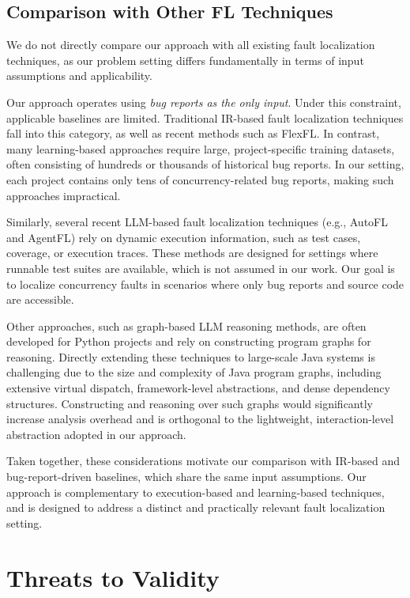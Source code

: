 \subsection{Comparison with Other FL Techniques}
\label{sec:discussion-comparison}

We do not directly compare our approach with all existing fault localization techniques, as our problem setting differs fundamentally in terms of input assumptions and applicability.

Our approach operates using \emph{bug reports as the only input}. Under this constraint, applicable baselines are limited.  Traditional IR-based fault localization techniques fall into this category, as well as recent methods such as FlexFL. In contrast, many learning-based approaches require large, project-specific training datasets, often consisting of hundreds or thousands of historical bug reports.
In our setting, each project contains only tens of concurrency-related bug reports, making such approaches impractical.

Similarly, several recent LLM-based fault localization techniques (e.g., AutoFL and AgentFL) rely on dynamic execution information, such as test cases, coverage, or execution traces.
These methods are designed for settings where runnable test suites are available, which is not assumed in our work.
Our goal is to localize concurrency faults in scenarios where only bug reports and source code are accessible.

Other approaches, such as graph-based LLM reasoning methods, are often developed for Python projects and rely on constructing program graphs for reasoning.
Directly extending these techniques to large-scale Java systems is challenging due to the size and complexity of Java program graphs, including extensive virtual dispatch, framework-level abstractions, and dense dependency structures.
Constructing and reasoning over such graphs would significantly increase analysis overhead and is orthogonal to the lightweight, interaction-level abstraction adopted in our approach.

Taken together, these considerations motivate our comparison with IR-based and bug-report-driven baselines, which share the same input assumptions.
Our approach is complementary to execution-based and learning-based techniques, and is designed to address a distinct and practically relevant fault localization setting.

\section{Threats to Validity}
\label{sec:threats}

